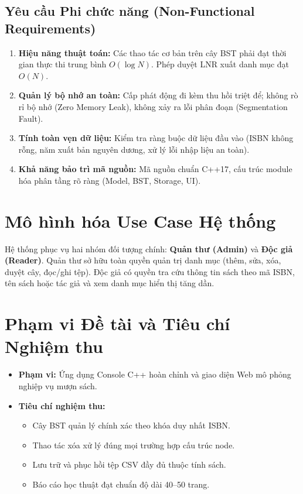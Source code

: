 \subsection{Yêu cầu Phi chức năng (Non-Functional Requirements)}
\begin{enumerate}
    \item \textbf{Hiệu năng thuật toán:} Các thao tác cơ bản trên cây BST phải đạt thời gian thực thi trung bình $O(\log N)$. Phép duyệt LNR xuất danh mục đạt $O(N)$.
    \item \textbf{Quản lý bộ nhớ an toàn:} Cấp phát động đi kèm thu hồi triệt để; không rò rỉ bộ nhớ (Zero Memory Leak), không xảy ra lỗi phân đoạn (Segmentation Fault).
    \item \textbf{Tính toàn vẹn dữ liệu:} Kiểm tra ràng buộc dữ liệu đầu vào (ISBN không rỗng, năm xuất bản nguyên dương, xử lý lỗi nhập liệu an toàn).
    \item \textbf{Khả năng bảo trì mã nguồn:} Mã nguồn chuẩn C++17, cấu trúc module hóa phân tầng rõ ràng (Model, BST, Storage, UI).
\end{enumerate}

\section{Mô hình hóa Use Case Hệ thống}
Hệ thống phục vụ hai nhóm đối tượng chính: \textbf{Quản thư (Admin)} và \textbf{Độc giả (Reader)}. Quản thư sở hữu toàn quyền quản trị danh mục (thêm, sửa, xóa, duyệt cây, đọc/ghi tệp). Độc giả có quyền tra cứu thông tin sách theo mã ISBN, tên sách hoặc tác giả và xem danh mục hiển thị tăng dần.

\section{Phạm vi Đề tài và Tiêu chí Nghiệm thu}
\begin{itemize}
    \item \textbf{Phạm vi:} Ứng dụng Console C++ hoàn chỉnh và giao diện Web mô phỏng nghiệp vụ mượn sách.
    \item \textbf{Tiêu chí nghiệm thu:}
    \begin{itemize}
        \item Cây BST quản lý chính xác theo khóa duy nhất ISBN.
        \item Thao tác xóa xử lý đúng mọi trường hợp cấu trúc node.
        \item Lưu trữ và phục hồi tệp CSV đầy đủ thuộc tính sách.
        \item Báo cáo học thuật đạt chuẩn độ dài 40--50 trang.
    \end{itemize}
\end{itemize}
